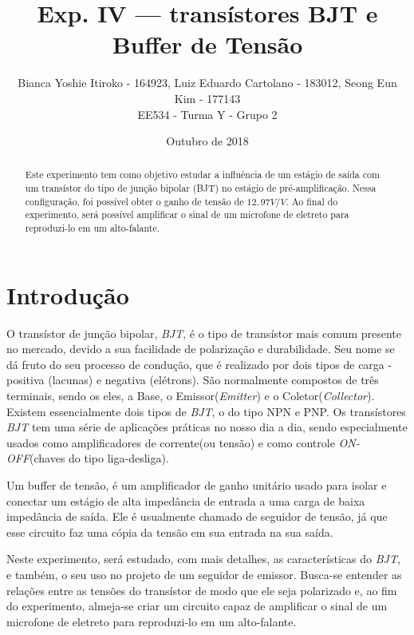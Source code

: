 \documentclass{article}
\begin{document}
    \title{Exp. IV — transístores BJT e Buffer de Tensão}
    \author{Bianca Yoshie Itiroko - 164923, Luiz Eduardo Cartolano - 183012, Seong Eun Kim - 177143 \\ EE534 - Turma Y - Grupo 2}
    \date{Outubro de 2018}
    
    \maketitle
    
    \begin{abstract}
        Este experimento tem como objetivo estudar a influência de um estágio de saída com um transístor do tipo de junção bipolar (BJT) no estágio de pré-amplificação. Nessa configuração, foi possível obter o ganho de tensão de $12,97 V/V$. Ao final do experimento, será possível amplificar o sinal de um microfone de eletreto para reproduzi-lo em um alto-falante.
    \end{abstract}
    
    \section{Introdução}
        O transístor de junção bipolar, \emph{BJT}, é o tipo de transístor mais comum presente no mercado, devido a sua facilidade de polarização e durabilidade. Seu nome se dá fruto do seu processo de condução, que é realizado por dois tipos de carga - positiva (lacunas) e negativa (elétrons).  São normalmente compostos de três terminais, sendo os eles, a Base, o Emissor(\emph{Emitter}) e o Coletor(\emph{Collector}). Existem essencialmente dois tipos de \emph{BJT}, o do tipo NPN e PNP. Os transístores \emph{BJT} tem uma série de aplicações práticas no nosso dia a dia, sendo especialmente usados como amplificadores de corrente(ou tensão) e como controle \emph{ON-OFF}(chaves do tipo liga-desliga).
    
        Um buffer de tensão, é um amplificador de ganho unitário usado para isolar e conectar um estágio de alta impedância de entrada a uma carga de baixa impedância de saída. Ele é usualmente chamado de seguidor de tensão, já que esse circuito faz uma cópia da tensão em sua entrada na sua saída.
    
        Neste experimento, será estudado, com mais detalhes, as características do \emph{BJT}, e também, o seu uso no projeto de um seguidor de emissor. Busca-se entender as relações entre as tensões do transístor de modo que ele seja polarizado e, ao fim do experimento, almeja-se criar um circuito capaz de amplificar o sinal de um microfone de eletreto para reproduzi-lo em um alto-falante.
    
\end{document}
